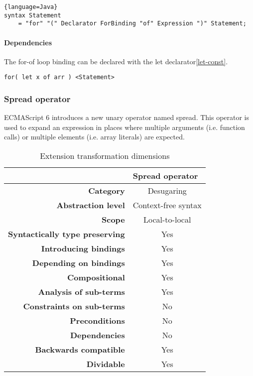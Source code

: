 \begin{lstlisting}{language=Java}
syntax Statement 
	= "for" "(" Declarator ForBinding "of" Expression ")" Statement;
\end{lstlisting}
    
\paragraph{Dependencies}
The for-of loop binding can be declared with the let declarator\ref{let-const}.

\begin{lstlisting}
for( let x of arr ) <Statement>
\end{lstlisting}


\subsubsection{Spread operator}
ECMAScript 6 introduces a new unary operator named spread\cite[12.3.6.1]{SpecJS}. This operator is used to expand an expression in places where multiple arguments (i.e. function calls) or multiple elements (i.e. array literals) are expected.

\begin{table}[h]
\centering
\caption{Extension transformation dimensions}
\label{spread-oeprator-table}
\begin{tabular}{@{}rc@{}}
\toprule
                                       & \multicolumn{1}{l}{\textbf{Spread operator}} \\ \midrule
\textbf{Category}                      & Desugaring
\\
\textbf{Abstraction level}          & Context-free syntax                          \\
\textbf{Scope}                         & Local-to-local                               \\
\textbf{Syntactically type preserving} & Yes                                          \\
\textbf{Introducing bindings}          & Yes                                          \\%
\textbf{Depending on bindings}         & Yes                                           \\
\textbf{Compositional}                 & Yes                                          \\
\textbf{Analysis of sub-terms}          & Yes                                          \\
\textbf{Constraints on sub-terms}       & No                                           \\
\textbf{Preconditions}                 & No                                          \\
\textbf{Dependencies}                  & No                                           \\
\textbf{Backwards compatible}          & Yes                                          \\
\textbf{Dividable}                     & Yes                                           \\ \bottomrule
\end{tabular}
\end{table}

